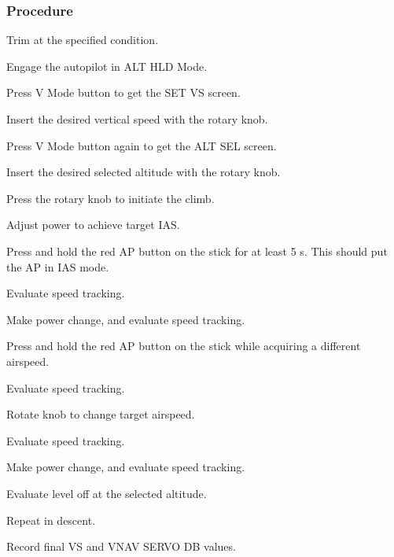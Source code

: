 \subsubsection*{Procedure}
 \begin{compactenum}
    \item Trim at the specified condition.
    \item Engage the autopilot in ALT HLD Mode.
    \item Press V Mode button to get the SET VS screen.
    \item Insert the desired vertical speed with the rotary knob.
    \item Press V Mode button again to get the ALT SEL screen.
    \item Insert the desired selected altitude with the rotary knob.
    \item Press the rotary knob to initiate the climb.  
    \item Adjust power to achieve target IAS.
    \item Press and hold the red AP button on the stick for at least 5 s.  This should put the AP in IAS mode. 
    \item Evaluate speed tracking.
    \item Make power change, and evaluate speed tracking.
    \item Press and hold the red AP button on the stick while acquiring a different airspeed.
    \item Evaluate speed tracking.
    \item Rotate knob to change target airspeed.
    \item Evaluate speed tracking.
    \item Make power change, and evaluate speed tracking.
    \item Evaluate level off at the selected altitude.
    \item Repeat in descent.
    \item Record final VS and VNAV SERVO DB values.
    \end{compactenum}
